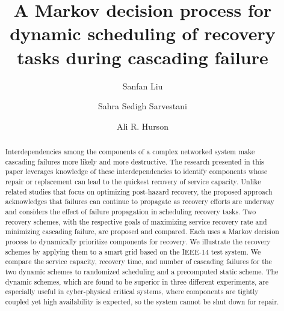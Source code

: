 \documentclass[runningheads]{llncs}
\begin{document}
%
%
\title{A Markov decision process for dynamic scheduling of recovery tasks during cascading failure}
%
%
\author{Sanfan Liu \and
Sahra Sedigh Sarvestani \and
Ali R. Hurson}
%
%

%
\maketitle              %
%
\begin{abstract}
Interdependencies among the components of a complex networked system make cascading failures more likely and more destructive. The research presented in this paper leverages knowledge of these interdependencies to identify components whose repair or replacement can lead to the quickest recovery of service capacity. Unlike related studies that focus on optimizing post-hazard recovery, the proposed approach acknowledges that failures can continue to propagate as recovery efforts are underway and considers the effect of failure propagation in scheduling recovery tasks. Two recovery schemes, with the respective goals of maximizing service recovery rate and minimizing cascading failure, are proposed and compared. Each uses a Markov decision process to dynamically prioritize components for recovery. We illustrate the recovery schemes by applying them to a smart grid based on the IEEE-14 test system. We compare the service capacity, recovery time, and number of cascading failures for the two dynamic schemes to randomized scheduling and a precomputed static scheme. The dynamic schemes, which are found to be superior in three different experiments, are especially useful in cyber-physical critical systems, where components are tightly coupled yet high availability is expected, so the system cannot be shut down for repair. 

\end{abstract}
%
%
%
\end{document}
